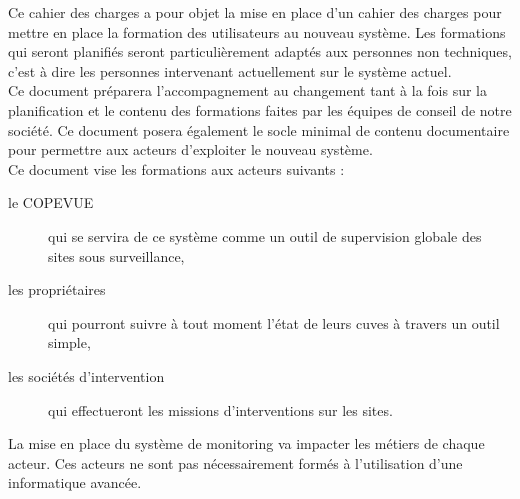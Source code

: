 Ce cahier des charges a pour objet la mise en place d'un cahier des charges pour mettre en place la formation des utilisateurs au nouveau système. Les formations qui seront planifiés seront particulièrement adaptés aux personnes non techniques, c'est à dire les personnes intervenant actuellement sur le système actuel. \\

Ce document préparera l'accompagnement au changement tant à la fois sur la planification et le contenu des formations faites par les équipes de conseil de notre société. Ce document posera
également le socle minimal de contenu documentaire pour permettre aux acteurs d'exploiter le nouveau système. \\

Ce document vise les formations aux acteurs suivants : 
\begin{description}
\item[le COPEVUE] qui se servira de ce système comme un outil de supervision globale des sites sous surveillance,
\item[les propriétaires] qui pourront suivre à tout moment l'état de leurs cuves à travers un outil simple, 
\item[les sociétés d'intervention] qui effectueront les missions d'interventions sur les sites.
\end{description}

La mise en place du système de monitoring va impacter les métiers de chaque acteur. Ces acteurs ne sont pas nécessairement formés à l'utilisation d'une informatique avancée.


